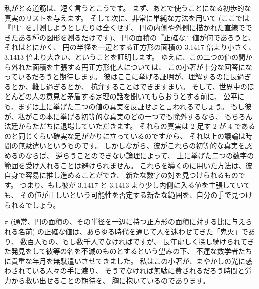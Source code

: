 \documentclass{article}
\begin{document}
私がとる道筋は、短く言うとこうです。
まず、あとで使うことになる初歩的な真実のリストを与えます。
そして次に、非常に単純な方法を用いて
(ここでは『円』を計測しようとしたりは全くせず、
円の内側や外側に描かれた直線でできたある種の図形を測るだけです)、
円の面積の『正確な』値が何であろうと、それはとにかく、
円の半径を一辺とする正方形の面積の 3.1417 倍より小さく、
3.1413 倍より大きい、ということを証明します。
ゆえに、この二つの値の間から外れた面積を主張する円正方形化人については、
この小著が十分な回答になっているだろうと期待します。
彼はここに挙げる証明が、理解するのに長過ぎるとか、難し過ぎるとか、
抗弁することはできますまい。
そして、世界中のほとんどの人の意見と矛盾する定理の話を聞いてもらおうとする前に、
公平にも、まずは上に挙げた二つの値の真実を反証せよと言われるでしょう。
もし彼が、私がこの本に挙げる初等的な真実のどの一つでも除外するなら、
もちろん法廷からただちに退場していただきます。
それらの真実は 2 足す 2 が 4 であるのと同じくらい確実な足がかりに立っているのですから、
それ以上の議論は時間の無駄遣いというものです。
しかしながら、彼がこれらの初等的な真実を認めるのならば、
逆らうことのできない論理によって、
上に挙げた二つの数字の範囲を受け入れることは避けられません。
これらを導くのに用いた方法は、彼自身で容易に推し進めることができ、
新たな数字の対を見つけられるものです。
つまり、もし彼が 3.1417 と 3.1413 より少し内側に入る値を主張していても、
その値が正しいという可能性を否定する新たな範囲を、自分の手で見つけられるでしょう。

 $\pi$
(通常、円の面積の、その半径を一辺に持つ正方形の面積に対する比に与えられる名前)
の正確な値は、あらゆる時代を通じて人を迷わせてきた「鬼火」であり、
数百人もの、もし数千人でなければですが、
長年虚しく探し続けられてきた発見をして彼等の名を不滅のものとするという望みの下、
不運な数学者たちに貴重な年月を無駄遣いさせてきました。
私はこの小著が、まやかしの光に惑わされている人々の手に渡り、
そうでなければ無駄に費されるだろう時間と労力から救い出せることの期待を、
胸に抱いているのであります。
\end{document}
